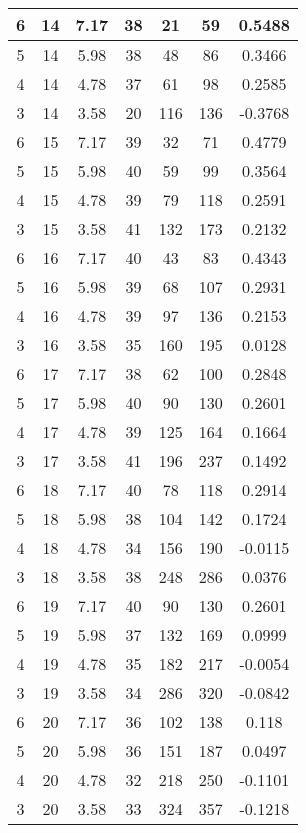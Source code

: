 \documentclass[letterpaper, 12pt]{article}
\begin{document}
\begin{longtable}{|c|c|c|c|c|c|c|}
\hline
6 & 14 & 7.17 & 38 & 21 & 59 & 0.5488 \\
\hline
5 & 14 & 5.98 & 38 & 48 & 86 & 0.3466 \\
\hline
4 & 14 & 4.78 & 37 & 61 & 98 & 0.2585 \\
\hline
3 & 14 & 3.58 & 20 & 116 & 136 & -0.3768 \\
\hline
6 & 15 & 7.17 & 39 & 32 & 71 & 0.4779 \\
\hline
5 & 15 & 5.98 & 40 & 59 & 99 & 0.3564 \\
\hline
4 & 15 & 4.78 & 39 & 79 & 118 & 0.2591 \\
\hline
3 & 15 & 3.58 & 41 & 132 & 173 & 0.2132 \\
\hline
6 & 16 & 7.17 & 40 & 43 & 83 & 0.4343 \\
\hline
5 & 16 & 5.98 & 39 & 68 & 107 & 0.2931 \\
\hline
4 & 16 & 4.78 & 39 & 97 & 136 & 0.2153 \\
\hline
3 & 16 & 3.58 & 35 & 160 & 195 & 0.0128 \\
\hline
6 & 17 & 7.17 & 38 & 62 & 100 & 0.2848 \\
\hline
5 & 17 & 5.98 & 40 & 90 & 130 & 0.2601 \\
\hline
4 & 17 & 4.78 & 39 & 125 & 164 & 0.1664 \\
\hline
3 & 17 & 3.58 & 41 & 196 & 237 & 0.1492 \\
\hline
6 & 18 & 7.17 & 40 & 78 & 118 & 0.2914 \\
\hline
5 & 18 & 5.98 & 38 & 104 & 142 & 0.1724 \\
\hline
4 & 18 & 4.78 & 34 & 156 & 190 & -0.0115 \\
\hline
3 & 18 & 3.58 & 38 & 248 & 286 & 0.0376 \\
\hline
6 & 19 & 7.17 & 40 & 90 & 130 & 0.2601 \\
\hline
5 & 19 & 5.98 & 37 & 132 & 169 & 0.0999 \\
\hline
4 & 19 & 4.78 & 35 & 182 & 217 & -0.0054 \\
\hline
3 & 19 & 3.58 & 34 & 286 & 320 & -0.0842 \\
\hline
6 & 20 & 7.17 & 36 & 102 & 138 & 0.118 \\
\hline
5 & 20 & 5.98 & 36 & 151 & 187 & 0.0497 \\
\hline
4 & 20 & 4.78 & 32 & 218 & 250 & -0.1101 \\
\hline
3 & 20 & 3.58 & 33 & 324 & 357 & -0.1218 \\
\hline
\end{longtable}
\end{document}
